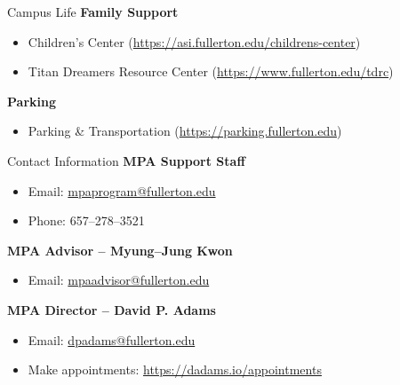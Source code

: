 \documentclass[10pt]{beamer}
\begin{document}
\begin{frame}{Campus Life}
\textbf{Family Support}
\begin{itemize}
  \item Children's Center \small(\url{https://asi.fullerton.edu/childrens-center})
  \item Titan Dreamers Resource Center \small(\url{https://www.fullerton.edu/tdrc})
\end{itemize}

\textbf{Parking}
\begin{itemize}
  \item Parking \& Transportation \small(\url{https://parking.fullerton.edu})
\end{itemize}
\end{frame}

\begin{frame}{Contact Information}
\textbf{MPA Support Staff}\\[-2pt]
\begin{itemize}
  \item Email: \href{mailto:mpaprogram@fullerton.edu}{mpaprogram@fullerton.edu}
  \item Phone: 657--278--3521
\end{itemize}

\textbf{MPA Advisor -- Myung--Jung Kwon}\\[-2pt]
\begin{itemize}
  \item Email: \href{mailto:mpaadvisor@fullerton.edu}{mpaadvisor@fullerton.edu}
\end{itemize}

\textbf{MPA Director -- David P. Adams}\\[-2pt]
\begin{itemize}
  \item Email: \href{mailto:dpadams@fullerton.edu}{dpadams@fullerton.edu}
  \item Make appointments: \url{https://dadams.io/appointments}
\end{itemize}
\end{frame}
\end{document}
